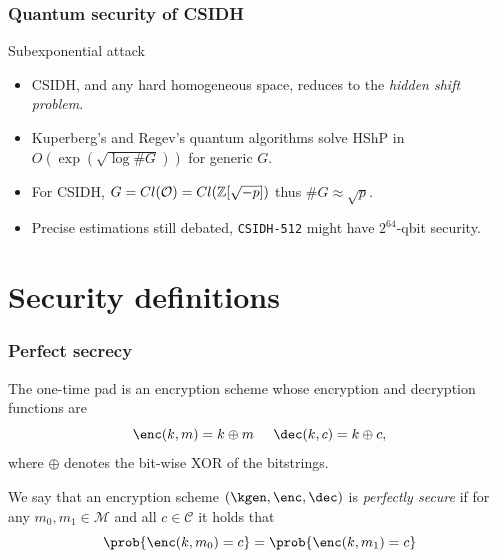 \documentclass{beamer}
\begin{document}
    \begin{frame}
        \frametitle{Quantum security of CSIDH}
        
        \begin{block}{Subexponential attack}
            \begin{itemize}
                \item CSIDH, and any hard homogeneous space, reduces to the \emph{hidden shift problem}.
                \item Kuperberg's and Regev's quantum algorithms solve HShP in $O(\exp(\sqrt{\log \# G}))$ for generic $G$.
                \item For CSIDH, $G=Cl(\mathcal{O})=Cl(\mathbb{Z}[\sqrt{-p}])$ thus $\# G\approx\sqrt{p}$.
                \item Precise estimations still debated, \texttt{CSIDH-512} might have $2^{64}$-qbit security.
            \end{itemize}
        \end{block}
    
    \end{frame}
    
    
    \section{Security definitions}
    
    \begin{frame}
        \frametitle{Perfect secrecy}
        
        \begin{definition}
            The one-time pad is an encryption scheme whose encryption and decryption functions are
            $$ \enc(k,m)=k\oplus m\;\;\;\;\; \dec(k,c)=k\oplus c,$$
            where $\oplus$ denotes the bit-wise XOR of the bitstrings.
        \end{definition}
    
        \begin{definition}
            We say that an encryption scheme $(\kgen,\enc,\dec)$ is \emph{perfectly secure} if for any $m_0,m_1\in\mathcal M$ and all $c\in\mathcal C$ it holds that 
            $$\prob{\enc(k,m_0)=c} = \prob{\enc(k,m_1)=c}$$
        \end{definition}
    
    \end{frame}
\end{document}
